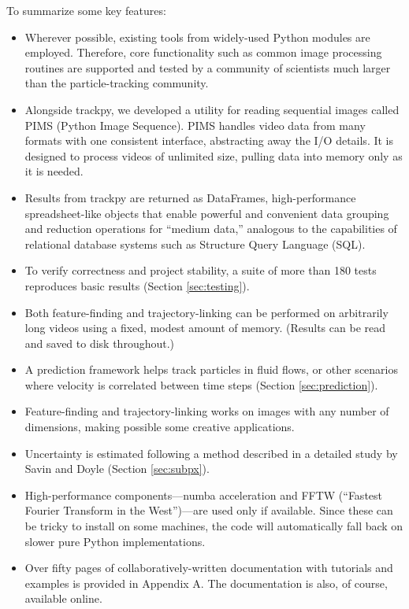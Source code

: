 To summarize some key features:
\begin{itemize}

\item Wherever possible, existing tools from widely-used Python modules are employed. Therefore, core functionality such as common image processing routines are supported and tested by a community of scientists much larger than the particle-tracking community.

\item Alongside trackpy, we developed a utility for reading sequential images called PIMS (Python Image Sequence). PIMS handles video data from many formats with one consistent interface, abstracting away the I/O details. It is designed to process videos of unlimited size, pulling data into memory only as it is needed.

\item Results from trackpy are returned as DataFrames, high-performance spreadsheet-like objects that enable powerful and convenient data grouping and reduction operations for ``medium data,'' analogous to the capabilities of relational database systems such as Structure Query Language (SQL).

\item To verify correctness and project stability, a suite of more than 180 tests reproduces basic results (Section \ref{sec:testing}).

\item Both feature-finding and trajectory-linking can be performed on arbitrarily long videos using a fixed, modest amount of memory. (Results can be read and saved to disk throughout.)

\item A prediction framework helps track particles in fluid flows, or other scenarios where velocity is correlated between time steps (Section \ref{sec:prediction}).

\item Feature-finding and trajectory-linking works on images with any number of dimensions, making possible some creative applications.

\item Uncertainty is estimated following a method described in a detailed study by Savin and Doyle\cite{Savin2005} (Section \ref{sec:subpx}).

\item High-performance components---numba acceleration and FFTW (``Fastest Fourier Transform in the West'')---are used only if available. Since these can be tricky to install on some machines, the code will automatically fall back on slower pure Python implementations.

\item Over fifty pages of collaboratively-written documentation with tutorials and examples is provided in Appendix A. The documentation is also, of course, available online.\cite{trackpy}

\end{itemize}


